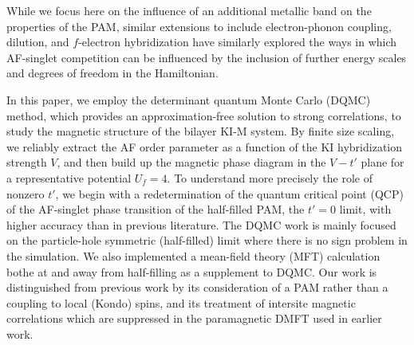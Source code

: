 \documentclass[pra,letterpaper,10pt,twocolumn]{revtex4}
\begin{document}
While we focus here on the influence of an additional metallic band on
the properties of the PAM, similar extensions to include electron-phonon
coupling\cite{Zhang13}, dilution\cite{Sen15}, and $f$-electron
hybridization\cite{Euverte13} have similarly explored the ways in which
AF-singlet competition can be influenced by the inclusion of further
energy scales and degrees of freedom in the Hamiltonian.

In this paper, we employ the determinant quantum Monte Carlo (DQMC)
method\cite{Blankenbecler81, Loh92}, which provides an
approximation-free solution to strong correlations, to study the
magnetic structure of the bilayer KI-M system. By finite size
scaling, we reliably extract the AF order
parameter as a function of the KI hybridization strength $V$, and then
build up the magnetic phase diagram in the $V-t'$ plane for a
representative potential $U_f=4$.  To understand more
precisely the role of nonzero $t'$, we begin with a redetermination of
the quantum critical point (QCP) of the AF-singlet phase transition of
the half-filled PAM, the $t'=0$ limit, with higher accuracy than in
previous literature\cite{Vekic95}. The DQMC work is mainly focused on the 
particle-hole symmetric (half-filled) limit where there is no
sign problem in the simulation. We also implemented a mean-field theory (MFT) 
calculation bothe at and away from half-filling as a supplement to DQMC. 
Our work is distinguished from
previous work\cite{peters13,Sen16} by its consideration of a PAM rather
than a coupling to local (Kondo) spins, and its treatment of intersite
magnetic correlations which are suppressed in the paramagnetic DMFT used in
earlier work.  

\end{document}
